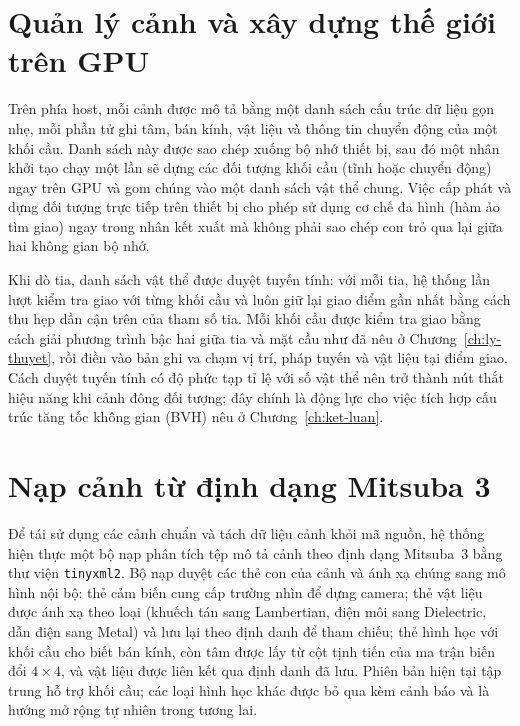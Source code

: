 \section{Quản lý cảnh và xây dựng thế giới trên GPU}
Trên phía host, mỗi cảnh được mô tả bằng một danh sách cấu trúc dữ liệu gọn nhẹ,
mỗi phần tử ghi tâm, bán kính, vật liệu và thông tin chuyển động của một khối cầu.
Danh sách này được sao chép xuống bộ nhớ thiết bị, sau đó một nhân khởi tạo chạy
một lần sẽ dựng các đối tượng khối cầu (tĩnh hoặc chuyển động) ngay trên
GPU và gom chúng vào một danh sách vật thể chung. Việc cấp phát và dựng đối tượng
trực tiếp trên thiết bị cho phép sử dụng cơ chế đa hình (hàm ảo tìm giao) ngay
trong nhân kết xuất mà không phải sao chép con trỏ qua lại giữa hai không gian bộ
nhớ.

Khi dò tia, danh sách vật thể được duyệt tuyến tính: với mỗi tia, hệ thống lần
lượt kiểm tra giao với từng khối cầu và luôn giữ lại giao điểm gần nhất bằng cách
thu hẹp dần cận trên của tham số tia. Mỗi khối cầu được kiểm tra giao bằng cách
giải phương trình bậc hai giữa tia và mặt cầu như đã nêu ở
Chương~\ref{ch:ly-thuyet}, rồi điền vào bản ghi va chạm vị trí, pháp tuyến và vật
liệu tại điểm giao. Cách duyệt tuyến tính có độ phức tạp tỉ lệ với số vật thể nên
trở thành nút thắt hiệu năng khi cảnh đông đối tượng; đây chính là động lực cho
việc tích hợp cấu trúc tăng tốc không gian (BVH) nêu ở Chương~\ref{ch:ket-luan}.

\section{Nạp cảnh từ định dạng Mitsuba 3}
Để tái sử dụng các cảnh chuẩn và tách dữ liệu cảnh khỏi mã nguồn, hệ thống hiện
thực một bộ nạp phân tích tệp mô tả cảnh theo định dạng Mitsuba~3 bằng thư viện
\texttt{tinyxml2}. Bộ nạp duyệt các thẻ con của cảnh và ánh xạ chúng sang mô hình
nội bộ: thẻ cảm biến cung cấp trường nhìn để dựng camera; thẻ vật liệu được ánh
xạ theo loại (khuếch tán sang Lambertian, điện môi sang Dielectric, dẫn điện sang
Metal) và lưu lại theo định danh để tham chiếu; thẻ hình học với khối cầu cho biết
bán kính, còn tâm được lấy từ cột tịnh tiến của ma trận biến đổi $4\times4$, và
vật liệu được liên kết qua định danh đã lưu. Phiên bản hiện tại tập trung hỗ trợ
khối cầu; các loại hình học khác được bỏ qua kèm cảnh báo và là hướng mở rộng tự
nhiên trong tương lai.

